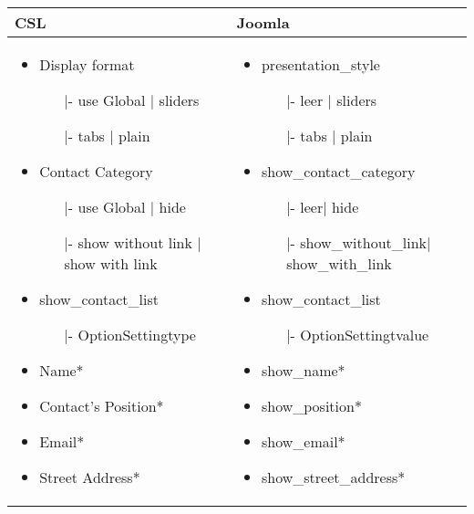 \begin{minipage}{0.6\textwidth}
\begin{longtable}{|p{} | p{}|}
\hline
\textbf{CSL} & \textbf{Joomla} \\ 
\hline
 \begin{itemize}
\item Display format
	\begin{enumerate}
	\item[|-] use Global | sliders
	\item[|-] tabs | plain
	\end{enumerate}
\item Contact Category
	\begin{enumerate}
	\item[|-] use Global | hide
	\item[|-] show without link | show with link
	\end{enumerate} 
\item show\_contact\_list
	\begin{enumerate}
		\item[|-] OptionSettingtype
	\end{enumerate} 
\item Name* 
\item Contact's Position* 
\item Email* 
\item Street Address* 
\end{itemize}
 & 
 \begin{itemize}
\item presentation\_style
\begin{enumerate}
	\item[|-] leer | sliders
	\item[|-] tabs | plain
	\end{enumerate} 
\item show\_contact\_category
\begin{enumerate}
	\item[|-]leer| hide
	\item[|-]show\_without\_link| show\_with\_link
	\end{enumerate} 
\item show\_contact\_list
\begin{enumerate}
		\item[|-] OptionSettingtvalue
	\end{enumerate} 
\item show\_name* 
\item show\_position* 
\item show\_email* 
\item show\_street\_address* 
\end{itemize}
\\
\hline
\end{longtable}
\end{minipage}

